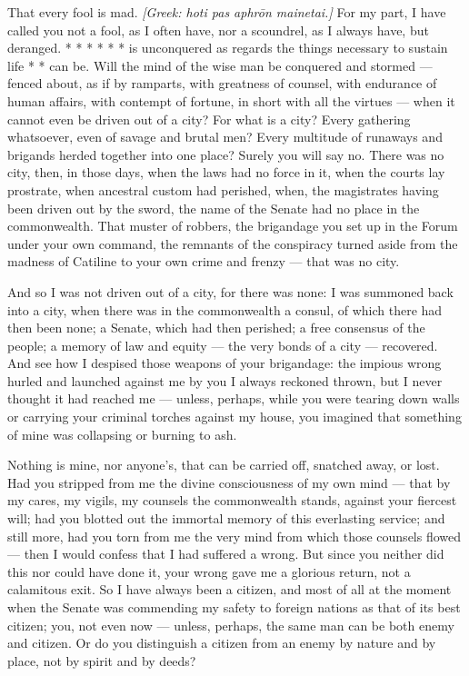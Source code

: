  That every fool is mad. \textit{[Greek: hoti pas aphrōn mainetai.]} For my part, I have called you not a fool, as I often have, nor a scoundrel, as I always have, but deranged. * * * * * * is unconquered as regards the things necessary to sustain life * * can be. Will the mind of the wise man be conquered and stormed — fenced about, as if by ramparts, with greatness of counsel, with endurance of human affairs, with contempt of fortune, in short with all the virtues — when it cannot even be driven out of a city? For what is a city? Every gathering whatsoever, even of savage and brutal men? Every multitude of runaways and brigands herded together into one place? Surely you will say no. There was no city, then, in those days, when the laws had no force in it, when the courts lay prostrate, when ancestral custom had perished, when, the magistrates having been driven out by the sword, the name of the Senate had no place in the commonwealth. That muster of robbers, the brigandage you set up in the Forum under your own command, the remnants of the conspiracy turned aside from the madness of Catiline to your own crime and frenzy — that was no city.

 And so I was not driven out of a city, for there was none: I was summoned back into a city, when there was in the commonwealth a consul, of which there had then been none; a Senate, which had then perished; a free consensus of the people; a memory of law and equity — the very bonds of a city — recovered. And see how I despised those weapons of your brigandage: the impious wrong hurled and launched against me by you I always reckoned thrown, but I never thought it had reached me — unless, perhaps, while you were tearing down walls or carrying your criminal torches against my house, you imagined that something of mine was collapsing or burning to ash.

 Nothing is mine, nor anyone's, that can be carried off, snatched away, or lost. Had you stripped from me the divine consciousness of my own mind — that by my cares, my vigils, my counsels the commonwealth stands, against your fiercest will; had you blotted out the immortal memory of this everlasting service; and still more, had you torn from me the very mind from which those counsels flowed — then I would confess that I had suffered a wrong. But since you neither did this nor could have done it, your wrong gave me a glorious return, not a calamitous exit. So I have always been a citizen, and most of all at the moment when the Senate was commending my safety to foreign nations as that of its best citizen; you, not even now — unless, perhaps, the same man can be both enemy and citizen. Or do you distinguish a citizen from an enemy by nature and by place, not by spirit and by deeds?


